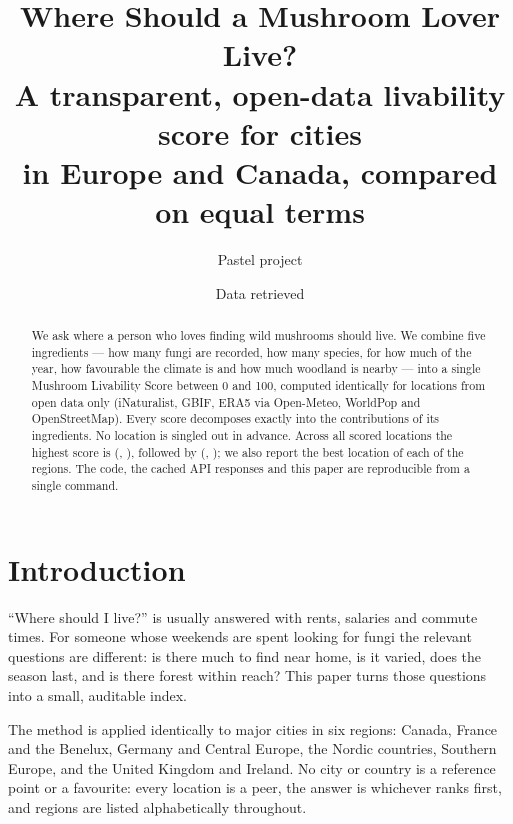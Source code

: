 \documentclass[11pt,a4paper]{article}
\title{Where Should a Mushroom Lover Live?\\[4pt]
\large A transparent, open-data livability score for \MLSNumLocations{} cities\\ in Europe and Canada, compared on equal terms}
\author{Pastel project}
\date{Data retrieved \MLSRetrievedDate}
\newcommand{\MLSscore}{Mushroom Livability Score}
\begin{document}
\maketitle

\ifMLSsynthetic
\begin{center}
\end{center}
\fi

\begin{abstract}
\noindent We ask where a person who loves finding wild mushrooms should live. We combine five ingredients
--- how many fungi are recorded, how many species, for how much of the year, how favourable the climate is
and how much woodland is nearby --- into a single \MLSscore{} between 0 and 100, computed identically for
\MLSNumLocations{} locations from open data only (iNaturalist, GBIF, ERA5 via Open-Meteo, WorldPop and
OpenStreetMap). Every score decomposes exactly into the contributions of its ingredients.
No location is singled out in advance. Across all \MLSNumScored{} scored locations the highest score is
\MLSLeaderScore{} (\MLSLeaderName{}, \MLSLeaderCountry{}), followed by \MLSRunnerUpScore{}
(\MLSRunnerUpName{}, \MLSRunnerUpCountry{}); we also report the best location of each of the
\MLSNumGroups{} regions. The code, the cached API responses and this paper are
reproducible from a single command.
\end{abstract}

\section{Introduction}

``Where should I live?'' is usually answered with rents, salaries and commute times. For someone whose
weekends are spent looking for fungi the relevant questions are different: is there much to find near
home, is it varied, does the season last, and is there forest within reach? This paper turns those
questions into a small, auditable index.

The method is applied identically to major cities in six regions: Canada, France and the Benelux, Germany
and Central Europe, the Nordic countries, Southern Europe, and the United Kingdom and Ireland. No city or
country is a reference point or a favourite: every location is a peer, the answer is whichever ranks first,
and regions are listed alphabetically throughout.
\end{document}
